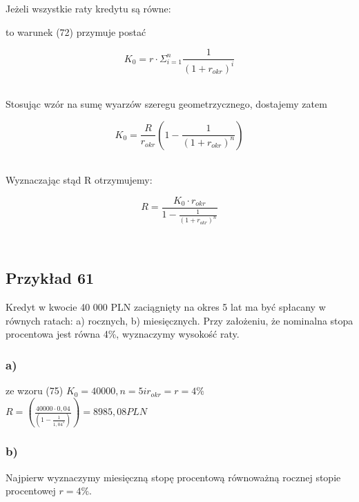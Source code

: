 \documentclass{article}
\begin{document}
Jeżeli wszystkie raty kredytu są równe:

to warunek (72) przymuje postać

\begin{center}
	\begin{equation}
		K_0 = r \cdot \Sigma ^n_{i=1} \frac{1}{(1 + r_{okr})^i}
	\end{equation}
\end{center}\\

Stosując wzór na sumę wyarzów szeregu geometrzycznego, dostajemy zatem

\begin{center}
	\begin{equation}
		K_0 = \frac{R}{r_{okr}}(1 - \frac{1}{(1 + r_{okr})^n})
	\end{equation}
\end{center}\\

Wyznaczając stąd R otrzymujemy:

\begin{center}
	\begin{equation}
		R = \frac{K_0 \cdot r_{okr}}{1 - \frac{1}{(1 + r_{okr})^n}}
	\end{equation}
\end{center}\\

\subsection{Przykład 61}

Kredyt w kwocie 40 000 PLN zaciągnięty na okres 5 lat ma być spłacany w równych ratach: a) rocznych, b) miesięcznych. Przy założeniu, że nominalna stopa procentowa jest równa 4\%, wyznaczymy wysokość raty.

\subsubsection{a)}

ze wzoru (75) $ K_0 = 40 000, n = 5 i r_{okr} = r = 4\% $\\

$ R = (\frac{40 000 \cdot 0,04}{(1 - \frac{1}{1,04^5})}) = 8985,08 PLN $

\subsubsection{b)}

Najpierw wyznaczymy miesięczną stopę procentową równoważną rocznej stopie procentowej $ r = 4\% $.\\
\end{document}
